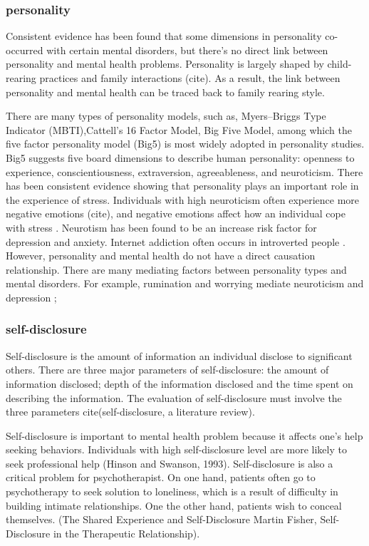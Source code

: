 \subsubsection{personality}

Consistent evidence has been found that some dimensions in personality co-occurred with certain mental disorders, but there's no direct link between personality and mental health problems. Personality is largely shaped by child-rearing practices and family interactions (cite). As a result, the link between personality and mental health can be traced back to family rearing style.

There are many types of personality models, such as, Myers–Briggs Type Indicator (MBTI),Cattell’s 16 Factor Model, Big Five Model, among which the five factor personality model (Big5) is most widely adopted in personality studies. Big5 suggests five board dimensions to describe human personality:  openness to experience, conscientiousness, extraversion, agreeableness, and neuroticism. There has been consistent evidence showing that personality plays an important role in the experience of stress. Individuals with high neuroticism often experience more negative emotions (cite), and negative emotions affect how an individual cope with stress \cite{kiecolt2002emotions}. Neurotism has been found to be an increase risk factor for depression and anxiety. \cite{talley1986association,cattell1961meaning} Internet addiction often occurs in introverted people \cite{xiuqin2010mental}. However, personality and mental health do not have a direct causation relationship. There are many mediating factors between personality types and mental disorders. For example, rumination and worrying mediate neuroticism and depression \cite{roelofs2008rumination};

\subsubsection{self-disclosure}
Self-disclosure is the amount of information an individual disclose to significant others. There are three major parameters of self-disclosure: the amount of information disclosed; depth of the information disclosed and the time spent on describing the information. The evaluation of self-disclosure must involve the three parameters cite(self-disclosure, a literature review).


Self-disclosure is important to mental health problem because it affects one's help seeking behaviors. Individuals with high self-disclosure level are more likely to seek professional help (Hinson and Swanson, 1993). Self-disclosure is also a critical problem for psychotherapist. On one hand, patients often go to psychotherapy to seek solution to loneliness, which is a result of difficulty in building intimate relationships. One the other hand, patients wish to conceal themselves. (The Shared Experience and Self-Disclosure Martin Fisher, Self-Disclosure in the Therapeutic Relationship). 

